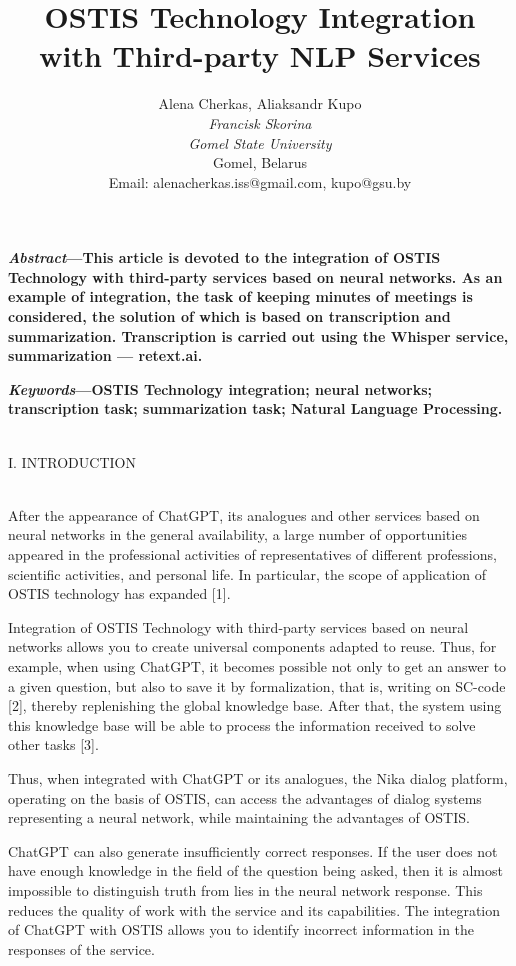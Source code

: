 \documentclass [a4paper, 10pt, twocolumn] {article}
\begin{document}
\author {\large {Alena Cherkas, Aliaksandr Kupo} \\ {\textit {Francisk Skorina}} \\ {\textit{Gomel State University}} \\{Gomel, Belarus} \\{Email: \large{alenacherkas.iss@gmail.com, kupo@gsu.by}}}
\date {}
\title {\textbf {OSTIS Technology Integration with Third-party NLP Services}}
\maketitle {} 
\textbf{\textit{Abstract}—This article is devoted to the integration of
OSTIS Technology with third-party services based on neural
networks. As an example of integration, the task of keeping
minutes of meetings is considered, the solution of which is
based on transcription and summarization. Transcription
is carried out using the Whisper service, summarization —
retext.ai.} 

\textbf{\textit{Keywords}—OSTIS Technology integration; neural networks; transcription task; summarization task; Natural
Language Processing.}
\\\\
\centerline{\large{I. I\small{NTRODUCTION}}}
\\

After the appearance of ChatGPT, its analogues and
other services based on neural networks in the general
availability, a large number of opportunities appeared in
the professional activities of representatives of different
professions, scientific activities, and personal life. In
particular, the scope of application of OSTIS technology
has expanded [1].

Integration of OSTIS Technology with third-party
services based on neural networks allows you to create
universal components adapted to reuse. Thus, for example,
when using ChatGPT, it becomes possible not only to
get an answer to a given question, but also to save it by
formalization, that is, writing on SC-code [2], thereby
replenishing the global knowledge base. After that, the
system using this knowledge base will be able to process
the information received to solve other tasks [3].

Thus, when integrated with ChatGPT or its analogues,
the Nika dialog platform, operating on the basis of OSTIS,
can access the advantages of dialog systems representing
a neural network, while maintaining the advantages of
OSTIS.

ChatGPT can also generate insufficiently correct responses. If the user does not have enough knowledge in
the field of the question being asked, then it is almost
impossible to distinguish truth from lies in the neural
network response. This reduces the quality of work
with the service and its capabilities. The integration of
ChatGPT with OSTIS allows you to identify incorrect
information in the responses of the service.
\end{document}
